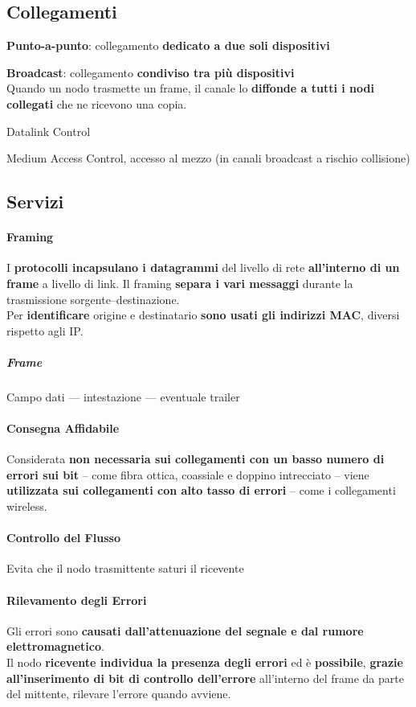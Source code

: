 \documentclass[10pt]{article}
\begin{document}
\subsection{Collegamenti}
\begin{list}{}{\textbf{Tipologie}:}
	\item \textbf{Punto-a-punto}: collegamento \textbf{dedicato a due soli dispositivi}
	\item \textbf{Broadcast}: collegamento \textbf{condiviso tra più dispositivi}\\
	Quando un nodo trasmette un frame, il canale lo \textbf{diffonde a tutti i nodi collegati} che ne ricevono una copia.
\end{list}
\begin{list}{}{Suddividibile in due \textbf{sottolivelli}:}
	\item Datalink Control
	\item Medium Access Control, accesso al mezzo (in canali broadcast a rischio collisione)
\end{list}
\pagebreak
\subsection{Servizi}
\paragraph{Framing} I \textbf{protocolli incapsulano i datagrammi} del livello di rete \textbf{all'interno di un frame} a livello di link. Il framing \textbf{separa i vari messaggi} durante la trasmissione sorgente--destinazione.\\
Per \textbf{identificare} origine e destinatario \textbf{sono usati gli indirizzi MAC}, diversi rispetto agli IP.
\subparagraph{Frame} Campo dati --- intestazione --- eventuale trailer
\paragraph{Consegna Affidabile} Considerata \textbf{non necessaria sui collegamenti con un basso numero di errori sui bit} -- come fibra ottica, coassiale e doppino intrecciato -- viene \textbf{utilizzata sui collegamenti con alto tasso di errori} -- come i collegamenti wireless.
\paragraph{Controllo del Flusso} Evita che il nodo trasmittente saturi il ricevente
\paragraph{Rilevamento degli Errori} Gli errori sono \textbf{causati dall'attenuazione del segnale e dal rumore elettromagnetico}.\\
Il nodo \textbf{ricevente individua la presenza degli errori} ed è \textbf{possibile}, \textbf{grazie all'inserimento di bit di controllo dell'errore} all'interno del frame da parte del mittente, rilevare l'errore quando avviene.
\end{document}
